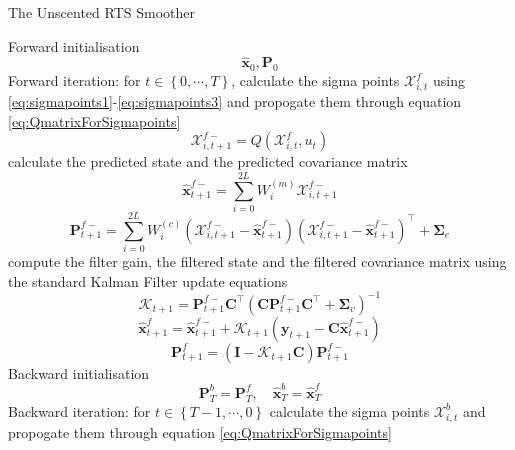 \documentclass[twocolumn,11pt,a4paper]{article}		%
\begin{document}
\begin{algorithm}
	\begin{small}
	\caption{The Unscented RTS Smoother}\label{UKFAlgorithm} 
	\begin{algorithmic}[1] 
		\State Forward initialisation 
		\begin{equation*}
		 \hat{\mathbf x}_0, \mathbf P_0 
		\end{equation*}
		\State Forward iteration: for $t \in \left\lbrace 0,\cdots, T\right\rbrace $,
		calculate the sigma points $\mathcal X_{i,t}^f$ using \ref{eq:sigmapoints1}-\ref{eq:sigmapoints3} and propogate them through equation \ref{eq:QmatrixForSigmapoints}
		\begin{equation*}
			\mathcal X_{i,t+1}^{f-}=Q(\mathcal X_{i,t}^f,u_t) 
		\end{equation*}
		calculate the predicted state and the predicted covariance matrix
		\begin{equation*}
			\hat{\mathbf x}_{t+1}^{f-}=\sum_{i=0}^{2L} W_i^{(m)}\mathcal X_{i,t+1}^{f-} 
		\end{equation*}
		\begin{equation*}
			\mathbf P_{t +1}^{f-}=\sum_{i=0}^{2L} W_i^{(c)}(\mathcal X_{i,t+1}^{f-}-\hat{\mathbf x}_{t +1}^{f-})(\mathcal X_{i,t+1}^{f-}-\hat{\mathbf x}_{t +1}^{f-})^\top+\boldsymbol \Sigma_e 
		\end{equation*}
		compute the filter gain, the filtered state and the filtered covariance matrix using the standard Kalman Filter update equations
		\begin{equation*}
			\mathcal K_{t+1}=\mathbf P_{t +1}^{f-}\mathbf C ^\top(\mathbf C \mathbf P_{t +1}^{f-}\mathbf C ^\top+\boldsymbol \Sigma_v)^{-1} 
		\end{equation*}
		\begin{equation*}
			\hat{\mathbf x}_{t+1}^{f}=\hat{\mathbf x}_{t+1}^{f-}+\mathcal K_{t+1}(\mathbf y_{t+1}-\mathbf C\hat{\mathbf x}_{t +1}^{f-}) 
		\end{equation*}
		\begin{equation*}
			\mathbf P_{t+1}^f=(\mathbf I - \mathcal K_{t+1}\mathbf C)\mathbf P_{t +1}^{f-} 
		\end{equation*}
		\State Backward initialisation 
		\begin{equation*}
			\mathbf P_T^b= \mathbf P_T^f, \quad \hat{\mathbf x}^b_T= \hat{\mathbf x}^f_T 
		\end{equation*}
		\State Backward iteration: for $t \in \left\lbrace T-1, \cdots, 0 \right\rbrace $ calculate the sigma points $\mathcal X_{i,t}^b$ and propogate them through equation \ref{eq:QmatrixForSigmapoints}

\end{algorithmic}
\end{small}
\end{algorithm}
\end{document}

